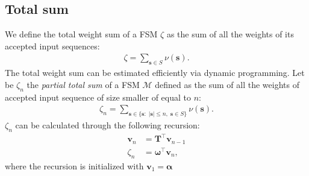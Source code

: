 \subsection{Total sum}

We define the total weight sum of a FSM $\zeta$ as the sum of all the
weights of its accepted input sequences:
\begin{align}
    \zeta = \sum_{\mathbf{s} \in S} \nu(\mathbf{s}).
\end{align}
The total weight sum can be estimated efficiently via dynamic
programming. Let be $\zeta_n$ the \emph{partial total sum} of a FSM
$\mathcal{M}$ defined as the sum of all the weights of accepted input
sequence of size smaller of equal to $n$:
\begin{align}
    \zeta_n = \sum_{\mathbf{s} \in
        \{ \mathbf{s} : \; | \mathbf{s} | \le n, \; \mathbf{s} \in S \}}
        \nu(\mathbf{s}).
\end{align}
$\zeta_n$ can be calculated through the following recursion:
\begin{align}
    \mathbf{v}_n &= \mathbf{T}^\top \mathbf{v}_{n-1} \\
    \zeta_n &= \boldsymbol{\omega}^\top \mathbf{v}_n,
\end{align}
where the recursion is initialized with $\mathbf{v}_1 = \boldsymbol{\alpha}$

